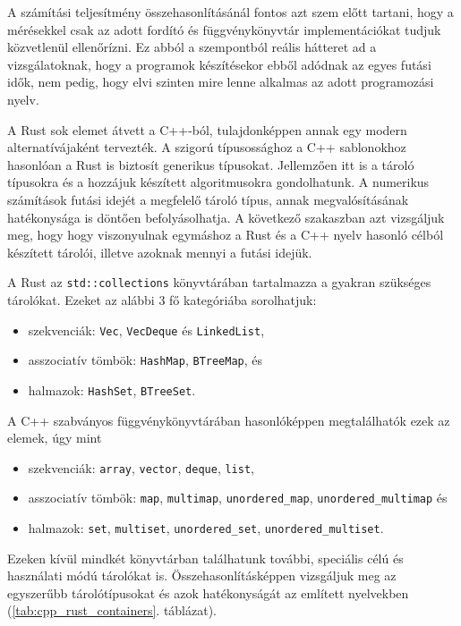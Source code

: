 A számítási teljesítmény összehasonlításánál fontos azt szem előtt tartani, hogy a mérésekkel csak az adott fordító és függvénykönyvtár implementációkat tudjuk közvetlenül ellenőrízni. Ez abból a szempontból reális hátteret ad a vizsgálatoknak, hogy a programok készítésekor ebből adódnak az egyes futási idők, nem pedig, hogy elvi szinten mire lenne alkalmas az adott programozási nyelv.

A Rust sok elemet átvett a C++-ból, tulajdonképpen annak egy modern alternatívájaként tervezték. A szigorú típusossághoz a C++ sablonokhoz hasonlóan a Rust is biztosít generikus típusokat. Jellemzően itt is a tároló típusokra és a hozzájuk készített algoritmusokra gondolhatunk. A numerikus számítások futási idejét a megfelelő tároló típus, annak megvalósításának hatékonysága is döntően befolyásolhatja. A következő szakaszban azt vizsgáljuk meg, hogy hogy viszonyulnak egymáshoz a Rust és a C++ nyelv hasonló célból készített tárolói, illetve azoknak mennyi a futási idejük.


A Rust az \texttt{std::collections} könyvtárában tartalmazza a gyakran szükséges tárolókat. Ezeket az alábbi 3 fő kategóriába sorolhatjuk:
\begin{itemize}
\item szekvenciák: \texttt{Vec}, \texttt{VecDeque} és \texttt{LinkedList},
\item asszociatív tömbök: \texttt{HashMap}, \texttt{BTreeMap}, és
\item halmazok: \texttt{HashSet}, \texttt{BTreeSet}.
\end{itemize}
A C++ szabványos függvénykönyvtárában hasonlóképpen megtalálhatók ezek az elemek, úgy mint
\begin{itemize}
\item szekvenciák: \texttt{array}, \texttt{vector}, \texttt{deque}, \texttt{list},
\item asszociatív tömbök: \texttt{map}, \texttt{multimap}, \texttt{unordered\_map}, \texttt{unordered\_multimap} és
\item halmazok: \texttt{set}, \texttt{multiset}, \texttt{unordered\_set}, \texttt{unordered\_multiset}.
\end{itemize}
Ezeken kívül mindkét könyvtárban találhatunk további, speciális célú és használati módú tárolókat is. Összehasonlításképpen vizsgáljuk meg az egyszerűbb tárolótípusokat és azok hatékonyságát az említett nyelvekben (\ref{tab:cpp_rust_containers}. táblázat).

